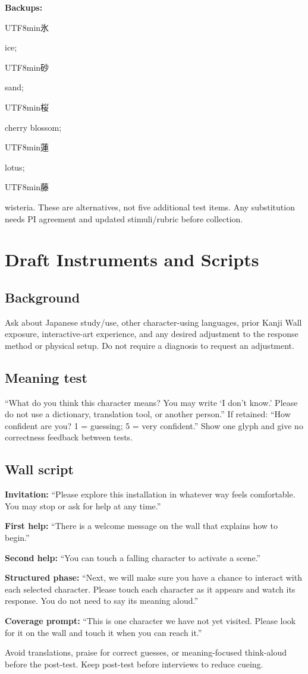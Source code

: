 \documentclass[11pt,letterpaper]{article}
\newcommand{\kanji}[1]{\begin{CJK}{UTF8}{min}#1\end{CJK}}
\begin{document}
\textbf{Backups:} \kanji{氷} ice; \kanji{砂} sand; \kanji{桜} cherry blossom; \kanji{蓮} lotus; \kanji{藤} wisteria. These are alternatives, not five additional test items. Any substitution needs PI agreement and updated stimuli/rubric before collection.

\section{Draft Instruments and Scripts}
\subsection{Background}
Ask about Japanese study/use, other character-using languages, prior Kanji Wall exposure, interactive-art experience, and any desired adjustment to the response method or physical setup. Do not require a diagnosis to request an adjustment.

\subsection{Meaning test}
``What do you think this character means? You may write `I don't know.' Please do not use a dictionary, translation tool, or another person.'' If retained: ``How confident are you? 1 = guessing; 5 = very confident.'' Show one glyph and give no correctness feedback between tests.

\subsection{Wall script}
\textbf{Invitation:} ``Please explore this installation in whatever way feels comfortable. You may stop or ask for help at any time.''

\textbf{First help:} ``There is a welcome message on the wall that explains how to begin.''

\textbf{Second help:} ``You can touch a falling character to activate a scene.''

\textbf{Structured phase:} ``Next, we will make sure you have a chance to interact with each selected character. Please touch each character as it appears and watch its response. You do not need to say its meaning aloud.''

\textbf{Coverage prompt:} ``This is one character we have not yet visited. Please look for it on the wall and touch it when you can reach it.''

Avoid translations, praise for correct guesses, or meaning-focused think-aloud before the post-test. Keep post-test before interviews to reduce cueing.
\end{document}
